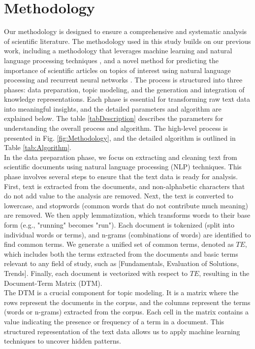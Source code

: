 \documentclass[runningheads]{llncs}
\begin{document}
\section{Methodology}

Our methodology is designed to ensure a comprehensive and systematic analysis of scientific literature. The methodology used in this study builds on our previous work, including a methodology that leverages machine learning and natural language processing techniques \cite{Hurtado2023}, and a novel method for predicting the importance of scientific articles on topics of interest using natural language processing and recurrent neural networks \cite{Lopez2024}. The process is structured into three phases: data preparation, topic modeling, and the generation and integration of knowledge representations. Each phase is essential for transforming raw text data into meaningful insights, and the detailed parameters and algorithm are explained below. The table \ref{tabDescription} describes the parameters for understanding the overall process and algorithm. The high-level process is presented in Fig. \ref{fig:Methodology}, and the detailed algorithm is outlined in Table \ref{tab:Algorithm}.\\ 

In the data preparation phase, we focus on extracting and cleaning text from scientific documents using natural language processing (NLP) techniques. This phase involves several steps to ensure that the text data is ready for analysis. First, text is extracted from the documents, and non-alphabetic characters that do not add value to the analysis are removed. Next, the text is converted to lowercase, and stopwords (common words that do not contribute much meaning) are removed. We then apply lemmatization, which transforms words to their base form (e.g., "running" becomes "run"). Each document is tokenized (split into individual words or terms), and n-grams (combinations of words) are identified to find common terms. We generate a unified set of common terms, denoted as $TE$, which includes both the terms extracted from the documents and basic terms relevant to any field of study, such as [Fundamentals, Evaluation of Solutions, Trends]. Finally, each document is vectorized with respect to $TE$, resulting in the Document-Term Matrix (DTM).\\

The DTM is a crucial component for topic modeling. It is a matrix where the rows represent the documents in the corpus, and the columns represent the terms (words or n-grams) extracted from the corpus. Each cell in the matrix contains a value indicating the presence or frequency of a term in a document. This structured representation of the text data allows us to apply machine learning techniques to uncover hidden patterns.\\
\end{document}
